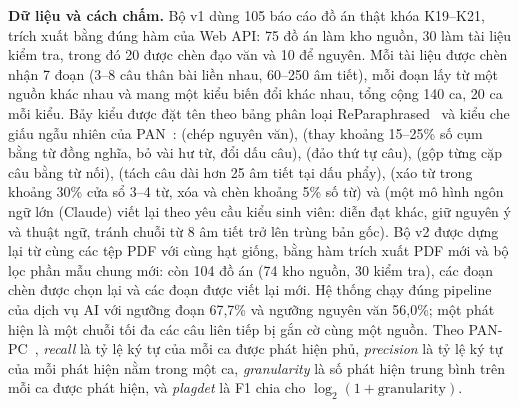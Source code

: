 \documentclass[../main.tex]{subfiles}
\begin{document}
\textbf{Dữ liệu và cách chấm.} Bộ v1 dùng 105 báo cáo đồ án thật khóa K19--K21, trích xuất bằng đúng hàm của Web API: 75 đồ án làm kho nguồn, 30 làm tài liệu kiểm tra, trong đó 20 được chèn đạo văn và 10 để nguyên. Mỗi tài liệu được chèn nhận 7 đoạn (3--8 câu thân bài liền nhau, 60--250 âm tiết), mỗi đoạn lấy từ một nguồn khác nhau và mang một kiểu biến đổi khác nhau, tổng cộng 140 ca, 20 ca mỗi kiểu. Bảy kiểu được đặt tên theo bảng phân loại ReParaphrased~\cite{zhou2024} và kiểu che giấu ngẫu nhiên của PAN~\cite{potthast2010}:  (chép nguyên văn),  (thay khoảng 15--25\% số cụm bằng từ đồng nghĩa, bỏ vài hư từ, đổi dấu câu),  (đảo thứ tự câu),  (gộp từng cặp câu bằng từ nối),  (tách câu dài hơn 25 âm tiết tại dấu phẩy),  (xáo từ trong khoảng 30\% cửa sổ 3--4 từ, xóa và chèn khoảng 5\% số từ) và  (một mô hình ngôn ngữ lớn (Claude) viết lại theo yêu cầu kiểu sinh viên: diễn đạt khác, giữ nguyên ý và thuật ngữ, tránh chuỗi từ 8 âm tiết trở lên trùng bản gốc). Bộ v2 được dựng lại từ cùng các tệp PDF với cùng hạt giống, bằng hàm trích xuất PDF mới và bộ lọc phần mẫu chung mới: còn 104 đồ án (74 kho nguồn, 30 kiểm tra), các đoạn chèn được chọn lại và các đoạn  được viết lại mới. Hệ thống chạy đúng pipeline của dịch vụ AI với ngưỡng đoạn 67,7\% và ngưỡng nguyên văn 56,0\%; một phát hiện là một chuỗi tối đa các câu liên tiếp bị gắn cờ cùng một nguồn. Theo PAN-PC~\cite{potthast2010}, \textit{recall} là tỷ lệ ký tự của mỗi ca được phát hiện phủ, \textit{precision} là tỷ lệ ký tự của mỗi phát hiện nằm trong một ca, \textit{granularity} là số phát hiện trung bình trên mỗi ca được phát hiện, và \textit{plagdet} là F1 chia cho $\log_2(1 + \text{granularity})$.
\end{document}
